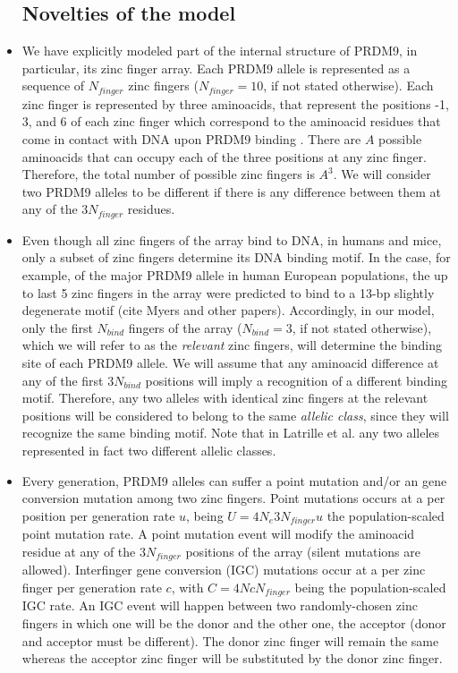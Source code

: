 \documentclass[a4paper,10pt]{article}
\begin{document}
\begin{itemize}
\subsection{Novelties of the model}
\label{Novelties}
\item We have explicitly modeled part of the internal structure of PRDM9, in particular, its zinc finger array. Each PRDM9 allele is represented as a sequence of $N_{finger}$ zinc fingers ($N_{finger} = 10$, if not stated otherwise). Each zinc finger is represented by three aminoacids, that represent the positions -1, 3, and 6 of each zinc finger which correspond to the aminoacid residues that come in contact with DNA upon PRDM9 binding \cite{Wolfe2000b}. There are $A$ possible aminoacids that can occupy each of the three positions at any zinc finger. Therefore, the total number of possible zinc fingers is $A^3$. We will consider two PRDM9 alleles to be different if there is any difference between them at any of the $3N_{finger}$ residues. %
\item Even though all zinc fingers of the array bind to DNA, in humans and mice, only a subset of zinc fingers determine its DNA binding motif. In the case, for example, of the major PRDM9 allele in human European populations, the up to last 5 zinc fingers in the array were predicted to bind to a 13-bp slightly degenerate motif (cite Myers and other papers). Accordingly, in our model, only the first $N_{bind}$ fingers of the array ($N_{bind} = 3$, if not stated otherwise), which we will refer to as the \textit{relevant} zinc fingers, will determine the binding site of each PRDM9 allele. We will assume that any aminoacid difference at any of the first $3N_{bind}$ positions will imply a recognition of a different binding motif. Therefore, any two alleles with identical zinc fingers at the relevant positions will be considered to belong to the same \textit{allelic class}, since they will recognize the same binding motif. Note that in Latrille et al. \cite{Latrille2017} any two alleles represented in fact two different allelic classes. 
 \item Every generation, PRDM9 alleles can suffer a point mutation and/or an gene conversion mutation among two zinc fingers. Point mutations occurs at a per position per generation rate $u$, being $U=4N_e 3 N_{finger} u$ the population-scaled point mutation rate. A point mutation event will modify the aminoacid residue at any of the $3N_{finger}$ positions of the array (silent mutations are allowed). Interfinger gene conversion (IGC) mutations occur at a per zinc finger per generation rate $c$, with $C=4Nc N_{finger}$ being the population-scaled IGC rate. An IGC event will happen between two randomly-chosen zinc fingers in which one will be the donor and the other one, the acceptor (donor and acceptor must be different). The donor zinc finger will remain the same whereas the acceptor zinc finger will be substituted by the donor zinc finger.  

\end{itemize}
\end{document}
